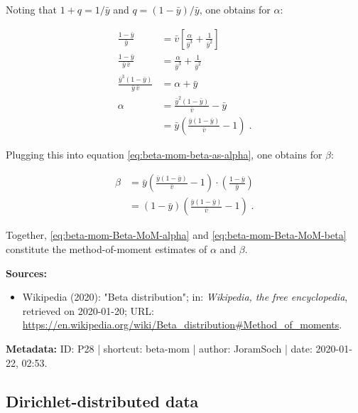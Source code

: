 \documentclass[a4paper,12pt,twoside]{book}
\begin{document}
Noting that $1+q = 1/\bar{y}$ and $q = (1-\bar{y})/\bar{y}$, one obtains for $\alpha$:

\begin{equation} \label{eq:beta-mom-Beta-MoM-alpha}
\begin{split}
\frac{1-\bar{y}}{\bar{y}} &= \bar{v} \left[ \frac{\alpha}{\bar{y}^3} + \frac{1}{\bar{y}^2} \right] \\
\frac{1-\bar{y}}{\bar{y} \, \bar{v}} &= \frac{\alpha}{\bar{y}^3} + \frac{1}{\bar{y}^2} \\
\frac{\bar{y}^3(1-\bar{y})}{\bar{y} \, \bar{v}} &= \alpha + \bar{y} \\
\alpha &= \frac{\bar{y}^2(1-\bar{y})}{\bar{v}} - \bar{y} \\
&= \bar{y} \left( \frac{\bar{y} (1-\bar{y})}{\bar{v}} - 1 \right) \; .
\end{split}
\end{equation}

Plugging this into equation \eqref{eq:beta-mom-beta-as-alpha}, one obtains for $\beta$:

\begin{equation} \label{eq:beta-mom-Beta-MoM-beta}
\begin{split}
\beta &= \bar{y} \left( \frac{\bar{y} (1-\bar{y})}{\bar{v}} - 1 \right) \cdot \left( \frac{1-\bar{y}}{\bar{y}} \right) \\
&= (1-\bar{y}) \left( \frac{\bar{y} (1-\bar{y})}{\bar{v}} - 1 \right) \; .
\end{split}
\end{equation}

Together, \eqref{eq:beta-mom-Beta-MoM-alpha} and \eqref{eq:beta-mom-Beta-MoM-beta} constitute the method-of-moment estimates of $\alpha$ and $\beta$.


\vspace{1em}
\textbf{Sources:}
\begin{itemize}
\item Wikipedia (2020): "Beta distribution"; in: \textit{Wikipedia, the free encyclopedia}, retrieved on 2020-01-20; URL: \url{https://en.wikipedia.org/wiki/Beta_distribution#Method_of_moments}.
\end{itemize}


\vspace{1em}
\textbf{Metadata:} ID: P28 | shortcut: beta-mom | author: JoramSoch | date: 2020-01-22, 02:53.
\vspace{1em}



\subsection{Dirichlet-distributed data}
\end{document}
